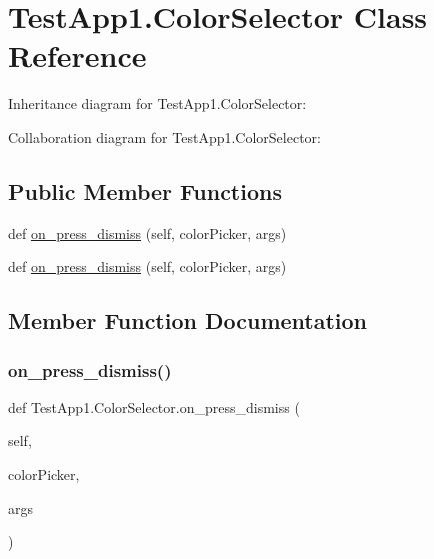 \hypertarget{classTestApp1_1_1ColorSelector}{}\section{Test\+App1.\+Color\+Selector Class Reference}
\label{classTestApp1_1_1ColorSelector}


Inheritance diagram for Test\+App1.\+Color\+Selector\+:


Collaboration diagram for Test\+App1.\+Color\+Selector\+:
\subsection*{Public Member Functions}
\begin{DoxyCompactItemize}
\item 
def \hyperlink{classTestApp1_1_1ColorSelector_afcecec797d6c063981dd5c29a6b876a3}{on\+\_\+press\+\_\+dismiss} (self, color\+Picker, args)
\item 
def \hyperlink{classTestApp1_1_1ColorSelector_afcecec797d6c063981dd5c29a6b876a3}{on\+\_\+press\+\_\+dismiss} (self, color\+Picker, args)
\end{DoxyCompactItemize}


\subsection{Member Function Documentation}
\mbox{\label{classTestApp1_1_1ColorSelector_afcecec797d6c063981dd5c29a6b876a3}} 
\subsubsection{\texorpdfstring{on\+\_\+press\+\_\+dismiss()}{on\_press\_dismiss()}\hspace{0.1cm}{\footnotesize\ttfamily [1/2]}}
{\footnotesize\ttfamily def Test\+App1.\+Color\+Selector.\+on\+\_\+press\+\_\+dismiss (\begin{DoxyParamCaption}\item[{}]{self,  }\item[{}]{color\+Picker,  }\item[{}]{args }\end{DoxyParamCaption})}

